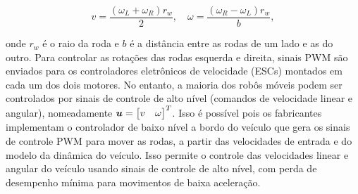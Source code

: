     \begin{equation} 
    v = \frac{(\omega_L + \omega_R)r_w}{2},\quad \omega = \frac{\left(\omega_R - \omega_L\right)r_w}{b}, 
    \end{equation} 
    
    onde $r_w$ é o raio da roda e $b$ é a distância entre as rodas de um lado e as do outro. Para controlar as rotações das rodas esquerda e direita, sinais PWM são enviados para os controladores eletrônicos de velocidade (ESCs) montados em cada um dos dois motores. No entanto, a maioria dos robôs móveis podem ser controlados por sinais de controle de alto nível (comandos de velocidade linear e angular), nomeadamente \( \boldsymbol{u} = \begin{bmatrix} v & \omega \end{bmatrix}^T \). Isso é possível pois os fabricantes implementam o controlador de baixo nível a bordo do veículo que gera os sinais de controle PWM para mover as rodas, a partir das velocidades de entrada e do modelo da dinâmica do veículo. Isso permite o controle das velocidades linear e angular do veículo usando sinais de controle de alto nível, com perda de desempenho mínima para movimentos de baixa aceleração.



